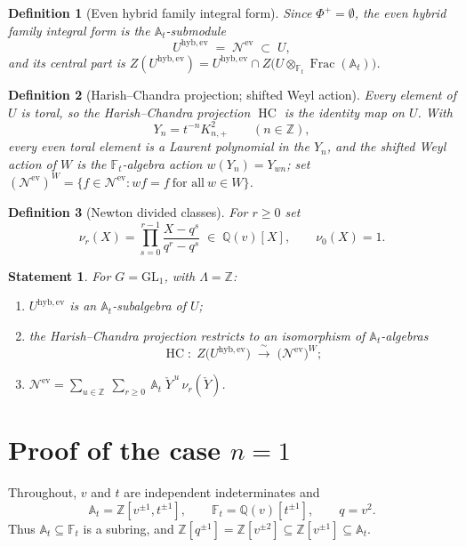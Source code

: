 \documentclass[11pt]{article}
\newtheorem{definition}{Definition}
\newtheorem*{goal}{Statement}
\newcommand{\At}{\mathbb{A}_t}
\newcommand{\Ft}{\mathbb{F}_t}
\newcommand{\Nev}{\mathcal N^{\mathrm{ev}}}
\newcommand{\Uev}{U^{\mathrm{hyb,ev}}}
\newcommand{\HC}{\operatorname{HC}}
\newcommand{\Yc}{\check Y}
\newcommand{\Z}{\mathbb Z}
\begin{document}
\begin{definition}[Even hybrid family integral form]\label{def:uev}
Since $\Phi^{+}=\emptyset$, the \emph{even hybrid family integral form} is the
$\At$-submodule
\[
  \Uev\;=\;\Nev\;\subset\;U,
\]
and its \emph{central part} is
$Z(\Uev)=\Uev\cap Z\bigl(U\otimes_{\Ft}\operatorname{Frac}(\At)\bigr)$.
\end{definition}

\begin{definition}[Harish--Chandra projection; shifted Weyl action]\label{def:hc}
Every element of $U$ is toral, so the \emph{Harish--Chandra projection} $\HC$ is
the identity map on $U$. With
\[
  Y_n=t^{-n}K_{n,+}^{2}\qquad(n\in\mathbb Z),
\]
every even toral element is a Laurent polynomial in the $Y_n$, and the
\emph{shifted Weyl action} of $W$ is the $\Ft$-algebra action
$w(Y_n)=Y_{wn}$; set $(\Nev)^{W}=\{f\in\Nev: wf=f\ \text{for all}\ w\in W\}$.
\end{definition}

\begin{definition}[Newton divided classes]\label{def:nu}
For $r\ge0$ set
\[
  \nu_{r}(X)=\prod_{s=0}^{r-1}\frac{X-q^{s}}{q^{r}-q^{s}}\;\in\;\mathbb Q(v)[X],
  \qquad \nu_0(X)=1 .
\]
\end{definition}

\begin{goal}\label{goal:main}
For $G=\mathrm{GL}_1$, with $\Lambda=\mathbb Z$:
\begin{enumerate}
  \item[(i)] $\Uev$ is an $\At$-subalgebra of $U$;
  \item[(ii)] the Harish--Chandra projection restricts to an isomorphism of
  $\At$-algebras
  \[
    \HC:\;Z\bigl(\Uev\bigr)\;\xrightarrow{\ \sim\ }\;\bigl(\Nev\bigr)^{W};
  \]
  \item[(iii)] $\displaystyle
    \Nev=\sum_{u\in\mathbb Z}\ \sum_{r\ge0}\ \At\;\Yc^{\,u}\,\nu_{r}(\Yc)$.
\end{enumerate}
\end{goal}

\section{Proof of the case $n=1$}

Throughout, $v$ and $t$ are independent indeterminates and
\[
  \At=\Z[v^{\pm1},t^{\pm1}],\qquad
  \Ft=\mathbb Q(v)[t^{\pm1}],\qquad
  q=v^{2}.
\]
Thus $\At\subseteq\Ft$ is a subring, and $\Z[q^{\pm1}]=\Z[v^{\pm2}]\subseteq
\Z[v^{\pm1}]\subseteq\At$.
\end{document}
